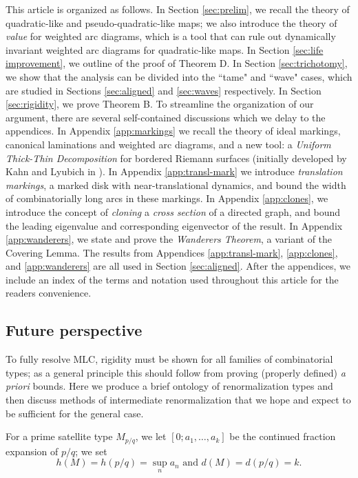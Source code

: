 \documentclass[12pt]{amsart}
\begin{document}
This article is organized as follows. In Section \ref{sec:prelim}, we recall the theory of quadratic-like and pseudo-quadratic-like maps; we also introduce the theory of \emph{value} for weighted arc diagrams, which is a tool that can rule out dynamically invariant weighted arc diagrams for quadratic-like maps.  In Section \ref{sec:life improvement}, we outline of the proof of Theorem D. 
In Section \ref{sec:trichotomy}, we show that the analysis can be divided into the ``tame" and ``wave" cases, which are studied in Sections \ref{sec:aligned} and \ref{sec:waves} respectively.
In Section \ref{sec:rigidity}, we prove Theorem B.
To streamline the organization of our argument, there are several self-contained discussions which we delay to the appendices.  
In Appendix \ref{app:markings} we recall the theory of ideal markings, canonical laminations and weighted arc diagrams, and a new tool: a {\em Uniform Thick-Thin Decomposition} for bordered Riemann surfaces
{(initially developed by Kahn and Lyubich in \cite{KL:eyes}).} 
In Appendix \ref{app:transl-mark} we introduce \textit{translation markings}, a marked disk with near-translational dynamics, {and bound the width of combinatorially long arcs in these markings}. 
{In Appendix \ref{app:clones}, we introduce the concept of \emph{cloning} a \emph{cross section} of a directed graph, and bound the leading eigenvalue and corresponding eigenvector of the result.}
In Appendix \ref{app:wanderers}, we state and prove the \textit{Wanderers Theorem}, a variant of the Covering Lemma.
The results from Appendices \ref{app:transl-mark}, \ref{app:clones}, and \ref{app:wanderers} are all used in Section \ref{sec:aligned}. {After the appendices, we include an index of the terms and notation used throughout this article for the readers convenience.}


\subsection{Future perspective}\label{sec:future perspective}
To fully resolve MLC, rigidity must be shown for all families of combinatorial types;
as a general {principle}    %
this should follow from proving (properly defined) \emph{a priori} bounds.
Here we produce a brief ontology of renormalization types and then discuss methods of intermediate renormalization that we hope and expect to be sufficient for the general case. 




For a prime satellite type $M_{p/q}$,
we let  $[0; a_{1}, \dots, a_{k}]$ be the continued fraction expansion of $p/q$; 
we set $$h(M) = h(p/q) = \sup_{n}a_{n}\text{ and }d(M) = d(p/q) = k.$$ 
\end{document}
